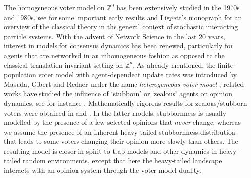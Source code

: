 \documentclass[11pt,a4paper]{scrartcl}
\numberwithin{equation}{section}
\theoremstyle{plain}
\theoremstyle{definition}
\theoremstyle{remark}
\begin{document}
The homogeneous voter model on $\mathbb{Z}^d$ has been extensively studied in the 1970s and 1980s, see \cite{MR0343950,MR0402985,MR0714951,MR0714952} for some important early results and Liggett's monograph \cite{Liggett85} for an overview of the classical theory in the general context of stochastic interacting particle systems. With the advent of Network Science in the last 20 years, interest in models for consensus dynamics has been renewed, particularly for agents that are networked in an inhomogeneous fashion as opposed to the classical translation invariant setting on $\mathbb{Z}^d$. As already mentioned, the finite-population voter model with agent-dependent update rates was introduced by Masuda, Gibert and Redner under the name \emph{heterogeneous voter model} \cite{MasudaGibertRedner10}; related works have studied the influence of `stubborn' or `zealous' agents on opinion dynamics, see for instance \cite{Redner07,yildiz2013binary,Verma14,Waagen14}. Mathematically rigorous results for zealous/stubborn voters were obtained in \cite{DurrettHuo19} and \cite{Roy20}. In the latter models, stubbornness is usually modelled by the presence of a few selected opinions that \emph{never} change, whereas we assume the presence of an inherent heavy-tailed stubbornness distribution that leads to some voters changing their opinion more slowly than others. The resulting model is closer in spirit to trap models and other dynamics in heavy-tailed random environments, except that here the heavy-tailed landscape interacts with an opinion system through the voter-model duality.

\end{document}
